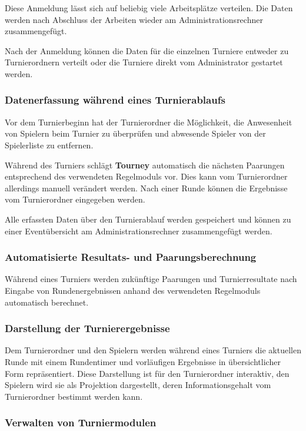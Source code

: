\documentclass[11pt]{article}
\begin{document}
Diese Anmeldung lässt sich auf beliebig viele Arbeitsplätze verteilen. Die Daten werden nach Abschluss der Arbeiten wieder am Administrationsrechner zusammengefügt.

Nach der Anmeldung können die Daten für die einzelnen Turniere entweder zu Turnierordnern verteilt oder die Turniere direkt vom Administrator gestartet werden.

\subsubsection{Datenerfassung während eines Turnierablaufs}

Vor dem Turnierbeginn hat der Turnierordner die Möglichkeit, die Anwesenheit von Spielern beim Turnier zu überprüfen und abwesende Spieler von der Spielerliste zu entfernen.

Während des Turniers schlägt \textbf{Tourney} automatisch die nächsten Paarungen entsprechend des verwendeten Regelmoduls vor. Dies kann vom Turnierordner allerdings manuell verändert werden. Nach einer Runde können die Ergebnisse vom Turnierordner eingegeben werden.

Alle erfassten Daten über den Turnierablauf werden gespeichert und können zu einer Eventübersicht am Administrationsrechner zusammengefügt werden.

\subsubsection{Automatisierte Resultats- und Paarungsberechnung}

Während eines Turniers werden zukünftige Paarungen und Turnierresultate nach Eingabe von Rundenergebnissen anhand des verwendeten Regelmoduls automatisch berechnet.

\subsubsection{Darstellung der Turnierergebnisse}

Dem Turnierordner und den Spielern werden während eines Turniers die aktuellen Runde mit einem Rundentimer und vorläufigen Ergebnisse in übersichtlicher Form repräsentiert. Diese Darstellung ist für den Turnierordner interaktiv, den Spielern wird sie als Projektion dargestellt, deren Informationsgehalt vom Turnierordner bestimmt werden kann.

\subsubsection{Verwalten von Turniermodulen}
\end{document}
